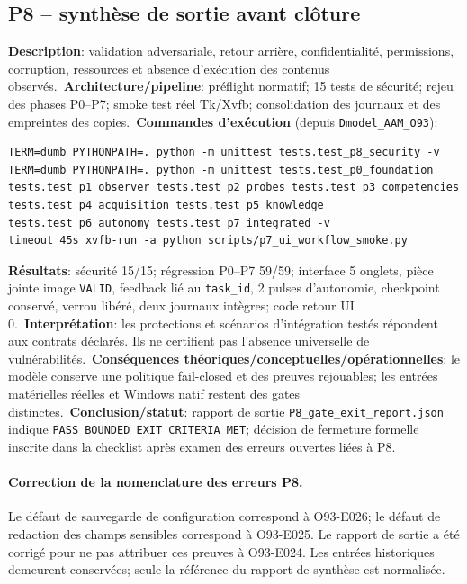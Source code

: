 \documentclass[11pt,a4paper,oneside]{report}
\begin{document}
\subsection{P8 -- synthèse de sortie avant clôture}
\textbf{Description}: validation adversariale, retour arrière, confidentialité, permissions, corruption, ressources et absence d'exécution des contenus observés.\
\textbf{Architecture/pipeline}: préflight normatif; 15 tests de sécurité; rejeu des phases P0--P7; smoke test réel Tk/Xvfb; consolidation des journaux et des empreintes des copies.\
\textbf{Commandes d'exécution} (depuis \texttt{Dmodel\_AAM\_O93}):
\begin{lstlisting}[basicstyle=\ttfamily\small,breaklines=true]
TERM=dumb PYTHONPATH=. python -m unittest tests.test_p8_security -v
TERM=dumb PYTHONPATH=. python -m unittest tests.test_p0_foundation tests.test_p1_observer tests.test_p2_probes tests.test_p3_competencies tests.test_p4_acquisition tests.test_p5_knowledge tests.test_p6_autonomy tests.test_p7_integrated -v
timeout 45s xvfb-run -a python scripts/p7_ui_workflow_smoke.py
\end{lstlisting}
\textbf{Résultats}: sécurité 15/15; régression P0--P7 59/59; interface 5 onglets, pièce jointe image \texttt{VALID}, feedback lié au \texttt{task\_id}, 2 pulses d'autonomie, checkpoint conservé, verrou libéré, deux journaux intègres; code retour UI 0.\
\textbf{Interprétation}: les protections et scénarios d'intégration testés répondent aux contrats déclarés. Ils ne certifient pas l'absence universelle de vulnérabilités.\
\textbf{Conséquences théoriques/conceptuelles/opérationnelles}: le modèle conserve une politique fail-closed et des preuves rejouables; les entrées matérielles réelles et Windows natif restent des gates distinctes.\
\textbf{Conclusion/statut}: rapport de sortie \texttt{P8\_gate\_exit\_report.json} indique \texttt{PASS\_BOUNDED\_EXIT\_CRITERIA\_MET}; décision de fermeture formelle inscrite dans la checklist après examen des erreurs ouvertes liées à P8.

\paragraph{Correction de la nomenclature des erreurs P8.}
Le défaut de sauvegarde de configuration correspond à O93-E026; le défaut de redaction des champs sensibles correspond à O93-E025. Le rapport de sortie a été corrigé pour ne pas attribuer ces preuves à O93-E024. Les entrées historiques demeurent conservées; seule la référence du rapport de synthèse est normalisée.
\end{document}
